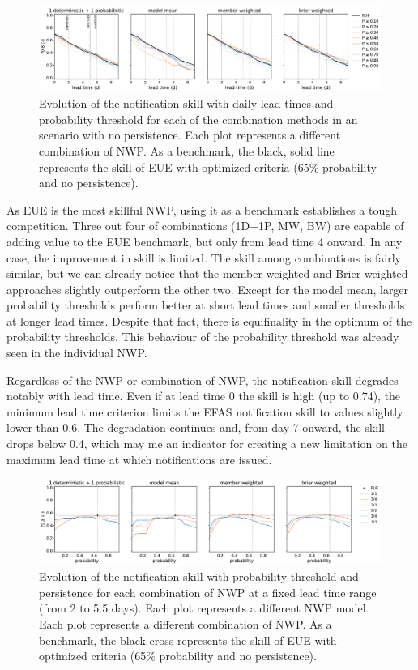 \documentclass[preprint,12pt]{elsarticle}
\begin{document}
\begin{figure}
    \centering
    \includegraphics[width=1\textwidth]{figures/skill_probability_leadtime_1-1_COMB_vs_EUE.pdf}
    \caption{Evolution of the notification skill with daily lead times and probability threshold for each of the combination methods in an scenario with no persistence. Each plot represents a different combination of NWP. As a benchmark, the black, solid line represents the skill of EUE with optimized criteria (65\% probability and no persistence).}
    \label{fig:COMB_skill_leadtime}
\end{figure}

As EUE is the most skillful NWP, using it as a benchmark establishes  a tough competition. Three out four of combinations (1D+1P, MW, BW) are capable of adding value to the EUE benchmark, but only from lead time 4 onward. In any case, the improvement in skill is limited. The skill among combinations is fairly similar, but we can already notice that the member weighted  and Brier weighted  approaches slightly outperform the other two. Except for the model mean, larger probability thresholds perform better at short lead times and smaller thresholds at longer lead times. Despite that fact, there is equifinality in the optimum of the probability thresholds. This behaviour of the probability threshold was already seen in the individual NWP.

Regardless of the NWP or combination of NWP, the notification skill degrades notably with lead time. Even if at lead time 0 the skill is high (up to 0.74), the minimum lead time criterion limits the EFAS notification skill to values slightly lower than 0.6. The degradation continues and, from day 7 onward, the skill drops below 0.4, which may me an indicator for creating a new limitation on the maximum lead time at which notifications are issued.

\begin{figure}
    \centering
    \includegraphics[width=1\textwidth]{figures/skill_persistence_probability_060h_COMB_vs_EUE.pdf}
    \caption{Evolution of the notification skill with probability threshold and persistence  for each combination of NWP at a fixed lead time range (from 2 to 5.5 days). Each plot represents a different NWP model. Each plot represents a different combination of NWP. As a benchmark, the black cross represents the skill of EUE with optimized criteria (65\% probability and no persistence).}
    \label{fig:COMB_skill_probability}
\end{figure}
\end{document}
